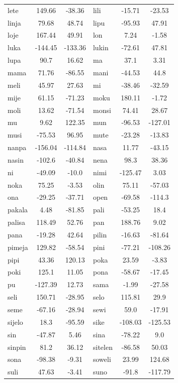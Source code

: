 \documentclass[14pt, a4paper]{extreport}
\begin{document}
\begin{longtable}{lcclcc}
lete & 149.66 & -38.36 & lili & -15.71 & -23.53 \\
linja & 79.68 & 48.74 & lipu & -95.93 & 47.91 \\
loje & 167.44 & 49.91 & lon & 7.24 & -1.58 \\
luka & -144.45 & -133.36 & lukin & -72.61 & 47.81 \\
lupa & 90.7 & 16.62 & ma & 37.1 & 3.31 \\
mama & 71.76 & -86.55 & mani & -44.53 & 44.8 \\
meli & 45.97 & 27.63 & mi & -38.46 & -32.59 \\
mije & 61.15 & -71.23 & moku & 180.11 & -1.72 \\
moli & 13.62 & -71.54 & monsi & 74.41 & 28.67 \\
mu & 9.62 & 122.35 & mun & -96.53 & -127.01 \\
musi & -75.53 & 96.95 & mute & -23.28 & -13.83 \\
nanpa & -156.04 & -114.84 & nasa & 11.77 & -43.15 \\
nasin & -102.6 & -40.84 & nena & 98.3 & 38.36 \\
ni & -49.09 & -10.0 & nimi & -125.47 & 3.03 \\
noka & 75.25 & -3.53 & olin & 75.11 & -57.03 \\
ona & -29.25 & -37.71 & open & -69.58 & -114.3 \\
pakala & 4.48 & -81.85 & pali & -53.25 & 18.4 \\
palisa & 118.49 & 52.76 & pan & 188.76 & 9.02 \\
pana & -19.28 & 42.64 & pilin & -16.63 & -81.64 \\
pimeja & 129.82 & -58.54 & pini & -77.21 & -108.26 \\
pipi & 43.36 & 120.13 & poka & 23.59 & -3.83 \\
poki & 125.1 & 11.05 & pona & -58.67 & -17.45 \\
pu & -127.39 & 12.73 & sama & -1.99 & -27.58 \\
seli & 150.71 & -28.95 & selo & 115.81 & 29.9 \\
seme & -67.16 & -28.94 & sewi & 59.0 & -17.91 \\
sijelo & 18.3 & -95.59 & sike & -108.03 & -125.53 \\
sin & -47.87 & 5.46 & sina & -78.22 & 9.0 \\
sinpin & 81.2 & 36.12 & sitelen & -86.58 & 50.03 \\
sona & -98.38 & -9.31 & soweli & 23.99 & 124.68 \\
suli & 47.63 & -3.41 & suno & -91.8 & -117.79 \\

\end{longtable}
\end{document}
